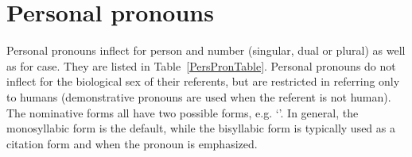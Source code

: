 \section{Personal pronouns}\label{personalPronouns}
Personal pronouns inflect for person and number (singular, dual or plural) as well as for case. They are listed in Table~\vref{PersPronTable}. Personal pronouns do not inflect for the biological sex of their referents, but are restricted in referring only to humans (demonstrative pronouns are used when the referent is not human). 
The nominative forms all have two possible forms, e.g. \TILDE{} ‘’. In general, the monosyllabic form is the default, while the bisyllabic form is typically used as a citation form and when the pronoun is emphasized.
